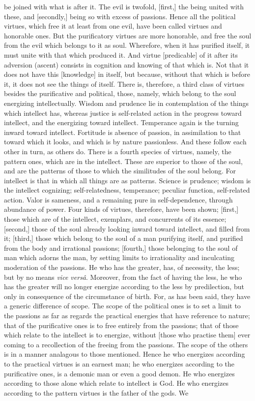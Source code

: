 \documentclass{article}
\begin{document}
be joined with what is after it. The evil is twofold, [first,] the being united with these, and [secondly,] being so with excess of passions. Hence all the political virtues, which free it at least from one evil, have been called virtues and honorable ones. But the purificatory virtues are more honorable, and free the soul from the evil which belongs to it as soul. Wherefore, when it has purified itself, it must unite with that which produced it. And virtue [predicable] of it after its adversion (ascent) consists in cognition and knowing of that which is. Not that it does not have this [knowledge] in itself, but because, without that which is before it, it does not see the things of itself. There is, therefore, a third class of virtues besides the purificative and political, those, namely, which belong to the soul energizing intellectually. Wisdom and prudence lie in contemplation of the things which intellect has, whereas justice is self-related action in the progress toward intellect, and the energizing toward intellect. Temperance again is the turning inward toward intellect. Fortitude is absence of passion, in assimilation to that toward which it looks, and which is by nature passionless. And these follow each other in turn, as others do. There is a fourth species of virtues, namely, the pattern ones, which are in the intellect. These are superior to those of the soul, and are the patterns of those to which the similitudes of the soul belong. For intellect is that in which all things are as patterns. Science is prudence; wisdom is the intellect cognizing; self-relatedness, temperance; peculiar function, self-related action. Valor is sameness, and a remaining pure in self-dependence, through abundance of power. Four kinds of virtues, therefore, have been shown; [first,] those which are of the intellect, exemplars, and concurrents of its essence; [second,] those of the soul already looking inward toward intellect, and filled from it; [third,] those which belong to the soul of a man purifying itself, and purified from the body and irrational passions; [fourth,] those belonging to the soul of man which adorns the man, by setting limits to irrationality and inculcating moderation of the passions. He who has the greater, has, of necessity, the less; but by no means \textit{vice vers\^{a}}. Moreover, from the fact of having the less, he who has the greater will no longer energize according to the less by predilection, but only in consequence of the circumstance of birth. For, as has been said, they have a generic difference of scope. The scope of the political ones is to set a limit to the passions as far as regards the practical energies that have reference to nature; that of the purificative ones is to free entirely from the passions; that of those which relate to the intellect is to energize, without [those who practise them] ever coming to a recollection of the freeing from the passions. The scope of the others is in a manner analagous to those mentioned. Hence he who energizes according to the practical virtues is an earnest man; he who energizes according to the purificative ones, is a demonic man or even a good demon. He who energizes according to those alone which relate to intellect is God. He who energizes according to the pattern virtues is the father of the gods. We 
\end{document}
